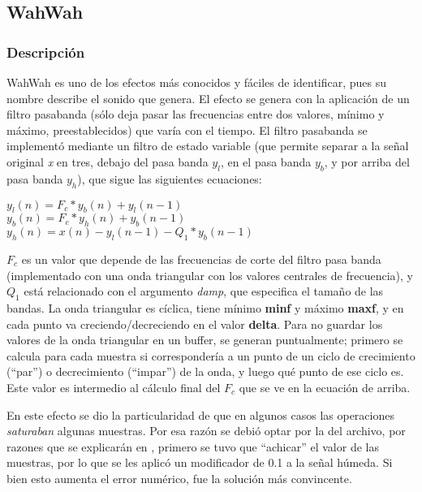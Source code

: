 \subsection{WahWah}
\label{subsec:desarrollo-wahwah}

\subsubsection{Descripción}
\label{subsec:desarrollo-wahwah-desc}

WahWah es uno de los efectos más conocidos y fáciles de identificar, pues su nombre describe el sonido que genera. El efecto se genera con la aplicación de un filtro pasabanda (sólo deja pasar las frecuencias entre dos valores, mínimo y máximo, preestablecidos) que varía con el tiempo. El filtro pasabanda se implementó mediante un filtro de estado variable (que permite separar a la señal original \textit{x} en tres, debajo del pasa banda $y_{l}$, en el pasa banda $y_{b}$, y por arriba del pasa banda $y_{h}$), que sigue las siguientes ecuaciones:

\begin{center}
 $y_{l}(n) = F_{c} * y_{b}(n) + y_{l}(n-1) $ \\
 $y_{b}(n) = F_{c} * y_{h}(n) + y_{b}(n-1) $\\
 $y_{h}(n) = x(n) - y_{l}(n-1) - Q_{1} * y_{b}(n-1)$
\end{center}

$F_{c}$ es un valor que depende de las frecuencias de corte del filtro pasa banda (implementado con una onda triangular con los valores centrales de frecuencia), y $Q_{1}$ está relacionado con el argumento \textit{damp}, que especifica el tamaño de las bandas. La onda triangular es cíclica, tiene mínimo \textbf{minf} y máximo \textbf{maxf}, y en cada punto va creciendo/decreciendo en el valor \textbf{delta}. Para no guardar los valores de la onda triangular en un buffer, se generan puntualmente; primero se calcula para cada muestra si correspondería a un punto de un ciclo de crecimiento (``par'') o decrecimiento (``impar'') de la onda, y luego qué punto de ese ciclo es. Este valor es intermedio al cálculo final del $F_{c}$ que se ve en la ecuación de arriba.

En este efecto se dio la particularidad de que en algunos casos las operaciones \textit{saturaban} algunas muestras. Por esa razón se debió optar por la  del archivo, por razones que se explicarán en , primero se tuvo que ``achicar'' el valor de las muestras, por lo que se les aplicó un modificador de 0.1 a la señal húmeda. Si bien esto aumenta el error numérico, fue la solución más convincente.



